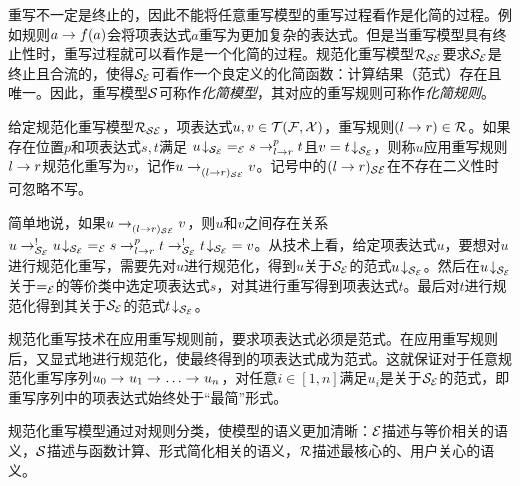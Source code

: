 重写不一定是终止的，因此不能将任意重写模型的重写过程看作是化简的过程。例如规则$a\ra f(a)$会将项表达式$a$重写为更加复杂的表达式。但是当重写模型具有终止性时，重写过程就可以看作是一个化简的过程。规范化重写模型$\RSE$要求$\SE$是终止且合流的，使得$\SE$可看作一个良定义的化简函数：计算结果（范式）存在且唯一。因此，重写模型$\cS$可称作\emph{化简模型}，其对应的重写规则可称作\emph{化简规则}。

\begin{definition}[规范化重写]
\label{d:normalrewriting}
给定规范化重写模型$\RSE$，项表达式$u,v\in\TFX$，重写规则$(l \ra r) \in \cR$。如果存在位置$p$和项表达式$s,t$满足
${\nf{u}{\SE}} =_{\cE} s \lrps{p}{l\ra r} t$且$v = {\nf{t}{\SE}}$，则称$u$应用重写规则$l\ra r$规范化重写为$v$，记作$u\lrps{}{(l\ra r)_{\cS\cE}} v$。记号中的$(l\ra r)_{\cS\cE}$在不存在二义性时可忽略不写。
\end{definition}

简单地说，如果$u\lrps{}{(l\ra r)_{\cS\cE}}v$，则$u$和$v$之间存在关系
$u \lrps{!}{\SE} {\nf{u}{\SE}} =_{\cE} s \lrps{p}{l\ra r} t \lrps{!}{\SE} {\nf{t}{\SE}} = v$。从技术上看，给定项表达式$u$，要想对$u$进行规范化重写，需要先对$u$进行规范化，得到$u$关于$\SE$的范式$\nf{u}{\SE}$。然后在$\nf{u}{\SE}$关于$=_{\cE}$的等价类中选定项表达式$s$，对其进行重写得到项表达式$t$。最后对$t$进行规范化得到其关于$\SE$的范式$\nf{t}{\SE}$。

规范化重写技术在应用重写规则前，要求项表达式必须是范式。在应用重写规则后，又显式地进行规范化，使最终得到的项表达式成为范式。这就保证对于任意规范化重写序列$u_0 \lrps{}{} u_1 \lrps{}{} \ldots \lrps{}{} u_n$，对任意$i\in [1,n]$满足$u_i$是关于$\SE$的范式，即重写序列中的项表达式始终处于“最简”形式。

规范化重写模型通过对规则分类，使模型的语义更加清晰：$\cE$描述与等价相关的语义，$\cS$描述与函数计算、形式简化相关的语义，$\cR$描述最核心的、用户关心的语义。

